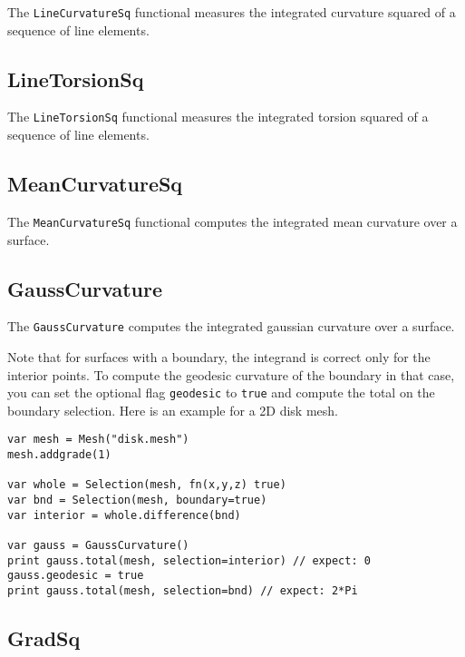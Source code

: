 The \texttt{LineCurvatureSq} functional measures the integrated
curvature squared of a sequence of line elements.

\hypertarget{linetorsionsq}{%
\subsection{LineTorsionSq}\label{linetorsionsq}}

The \texttt{LineTorsionSq} functional measures the integrated torsion
squared of a sequence of line elements.

\hypertarget{meancurvaturesq}{%
\subsection{MeanCurvatureSq}\label{meancurvaturesq}}

The \texttt{MeanCurvatureSq} functional computes the integrated mean
curvature over a surface.

\hypertarget{gausscurvature}{%
\subsection{GaussCurvature}\label{gausscurvature}}

The \texttt{GaussCurvature} computes the integrated gaussian curvature
over a surface.

Note that for surfaces with a boundary, the integrand is correct only
for the interior points. To compute the geodesic curvature of the
boundary in that case, you can set the optional flag \texttt{geodesic}
to \texttt{true} and compute the total on the boundary selection. Here
is an example for a 2D disk mesh.

\begin{lstlisting}
var mesh = Mesh("disk.mesh")
mesh.addgrade(1)

var whole = Selection(mesh, fn(x,y,z) true)
var bnd = Selection(mesh, boundary=true)
var interior = whole.difference(bnd)

var gauss = GaussCurvature()
print gauss.total(mesh, selection=interior) // expect: 0
gauss.geodesic = true
print gauss.total(mesh, selection=bnd) // expect: 2*Pi
\end{lstlisting}

\hypertarget{gradsq}{%
\subsection{GradSq}\label{gradsq}}


